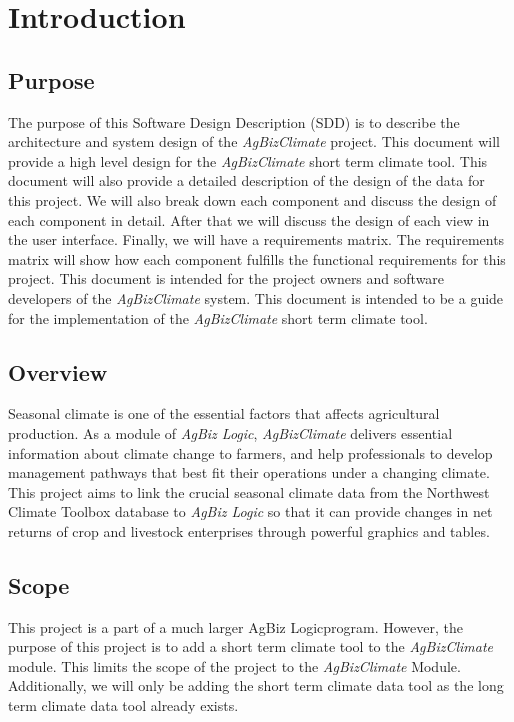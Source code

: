 \documentclass[onecolumn, draftclsnofoot,10pt, compsoc]{article}
\begin{document}
\section{Introduction}

		\subsection{Purpose}
			The purpose of this Software Design Description (SDD) is to describe the architecture and system design of the \textit{AgBizClimate} project. This document will provide a high level design for the \textit{AgBizClimate} short term climate tool. This document will also provide a detailed description of the design of the data for this project. We will also break down each component and discuss the design of each component in detail. After that we will discuss the design of each view in the user interface. Finally, we will have a requirements matrix. The requirements matrix will show how each component fulfills the functional requirements for this project.
			This document is intended for the project owners and software developers of the \textit{AgBizClimate} system. This document is intended to be a guide for the implementation of the \textit{AgBizClimate} short term climate tool.

		\subsection{Overview}
			Seasonal climate is one of the essential factors that affects agricultural production. As a module of \textit{AgBiz Logic}, \textit{AgBizClimate} delivers essential information about climate change to farmers, and help professionals to develop management pathways that best fit their operations under a changing climate. This project aims to link the crucial seasonal climate data from the Northwest Climate Toolbox database to \textit{AgBiz Logic} so that it can provide changes in net returns of crop and livestock enterprises through powerful graphics and tables.\\

		\subsection{Scope}
			This project is a part of a much larger AgBiz Logic\texttrademark program. However, the purpose of this project is to add a short term climate tool to the \textit{AgBizClimate} module. This limits the scope of the project to the \textit{AgBizClimate} Module. Additionally, we will only be adding the short term climate data tool as the long term climate data tool already exists.\\
\end{document}
